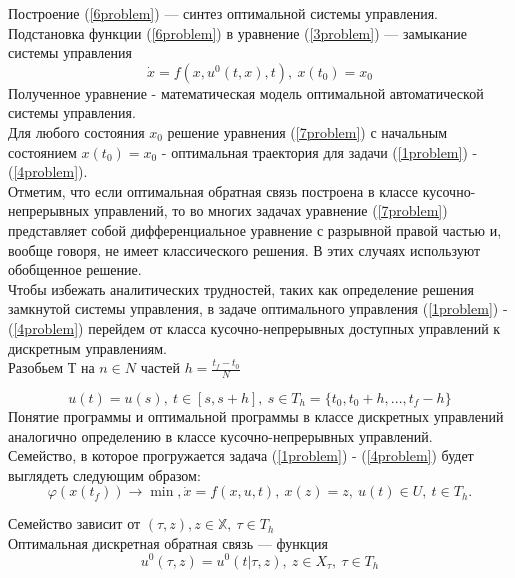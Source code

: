 Построение (\ref{6problem}) --- синтез оптимальной системы управления.\\
Подстановка функции (\ref{6problem}) в уравнение (\ref{3problem}) --- замыкание системы управления
\begin{equation} \label{7problem}
    \dot{x}=f(x,u^0(t,x),t),\ x(t_0)=x_0
     \end{equation}
Полученное уравнение - математическая модель оптимальной автоматической системы управления.\\
Для любого состояния $x_0$ решение уравнения (\ref{7problem}) с начальным состоянием $x(t_0)=x_0$ - оптимальная траектория для задачи (\ref{1problem}) - (\ref{4problem}).\\
Отметим, что если оптимальная обратная связь построена в классе кусочно-непрерывных управлений, то во многих задачах уравнение (\ref{7problem}) представляет собой
дифференциальное уравнение с разрывной правой частью и, вообще говоря, не имеет классического решения. В этих случаях используют обобщенное решение.\\
Чтобы избежать аналитических трудностей, таких как определение решения замкнутой системы управления, в задаче оптимального управления (\ref{1problem}) - (\ref{4problem})
перейдем от класса кусочно-непрерывных доступных управлений к дискретным управлениям.\\
Разобьем Т на $n\in N$ частей $h = \frac{t_f - t_0}{N}$

\begin{equation}
    u(t) = u(s),\ t\in [s, s+h],\ s\in T_h = \{t_0, t_0 + h, ..., t_f - h\}
     \end{equation}
Понятие программы и оптимальной программы в классе дискретных управлений аналогично определению в классе кусочно-непрерывных управлений.\\
Семейство, в которое прогружается задача (\ref{1problem}) - (\ref{4problem}) будет выглядеть следующим образом:
\begin{equation} \label{8problem}
    \varphi(x(t_f))\to \min,
    \dot{x}=f(x,u,t),\ x(z)=z,\ 
  	 u(t)\in U,\  t\in T_h.
     \end{equation}

Семейство зависит от $(\tau,z), z\in \mathbb{X},\ \tau\in T_h$\\
Оптимальная дискретная обратная связь --- функция 
\begin{equation} \label{9problem}
    u^0(\tau,z) = u^0(t|\tau,z),\  z \in X_\tau,\ \tau \in T_h
\end{equation}

